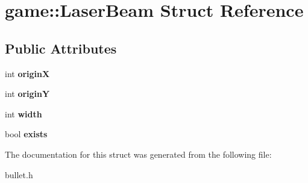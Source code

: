 \hypertarget{structgame_1_1LaserBeam}{}\section{game\+:\+:Laser\+Beam Struct Reference}
\label{structgame_1_1LaserBeam}
\subsection*{Public Attributes}
\begin{DoxyCompactItemize}
\item 
\mbox{\label{structgame_1_1LaserBeam_a27e1508dcb195c54d04747a7549a1186}} 
int {\bfseries originX}
\item 
\mbox{\label{structgame_1_1LaserBeam_ade2146adfea9744f171c6882a4f36b8d}} 
int {\bfseries originY}
\item 
\mbox{\label{structgame_1_1LaserBeam_a57902395c0955a1432a8ca35f3a79e74}} 
int {\bfseries width}
\item 
\mbox{\label{structgame_1_1LaserBeam_a40211d9aacb82d8aa4fec703b54b56cb}} 
bool {\bfseries exists}
\end{DoxyCompactItemize}


The documentation for this struct was generated from the following file\+:\begin{DoxyCompactItemize}
\item 
bullet.\+h\end{DoxyCompactItemize}
